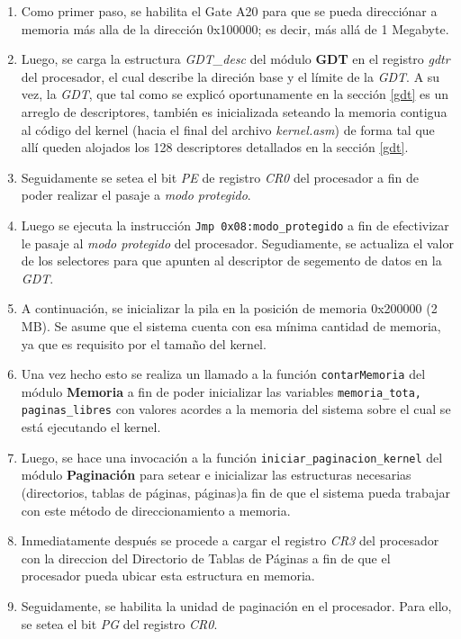 \documentclass[11pt, a4paper]{article}
\begin{document}
	\begin{enumerate}
		\item Como primer paso, se habilita el Gate A20 para que se pueda direcciónar a memoria más alla de la dirección 0x100000; es decir, más allá de 1 Megabyte.
		\item Luego, se carga la estructura \textit{GDT\_desc} del módulo \textbf{GDT} en el registro \textit{gdtr} del procesador, el cual describe la direción base y el límite de la \textit{GDT}. A su vez, la \textit{GDT}, que tal como se explicó oportunamente en la sección \ref{gdt} es un arreglo de descriptores, también es inicializada seteando la memoria contigua al código del kernel (hacia el final del archivo \textit{kernel.asm}) de forma tal que allí queden alojados los 128 descriptores detallados en la sección \ref{gdt}. 
		\item Seguidamente se setea el bit \textit{PE} de registro \textit{CR0} del procesador a fin de poder realizar el pasaje a \textit{modo protegido}.
		\item Luego se ejecuta la instrucción \texttt{Jmp 0x08:modo\_protegido} a fin de efectivizar le pasaje al \textit{modo protegido} del procesador. Segudiamente, se actualiza el valor de los selectores para que apunten al descriptor de segemento de datos en la \textit{GDT}.
		\item A continuación, se inicializar la pila en la posición de memoria 0x200000 (2 MB). Se asume que el sistema cuenta con esa mínima cantidad de memoria, ya que es requisito por el tamaño del kernel.
		\item Una vez hecho esto se realiza un llamado a la función \texttt{contarMemoria} del módulo \textbf{Memoria} a fin de poder inicializar las variables \texttt{memoria\_tota, paginas\_libres} con valores acordes a la memoria del sistema sobre el cual se está ejecutando el kernel.
		\item Luego, se hace una invocación a la función \texttt{iniciar\_paginacion\_kernel} del módulo \textbf{Paginación} para setear e inicializar las estructuras necesarias (directorios, tablas de páginas, páginas)a fin de que el sistema pueda trabajar con este método de direccionamiento a memoria.
		\item Inmediatamente después se procede a cargar el registro \textit{CR3} del procesador con la direccion del Directorio de Tablas de Páginas a fin de que el procesador pueda ubicar esta estructura en memoria.
		\item Seguidamente, se habilita la unidad de paginación en el procesador. Para ello, se setea el bit \textit{PG} del registro \textit{CR0}.

\end{enumerate}
\end{document}
